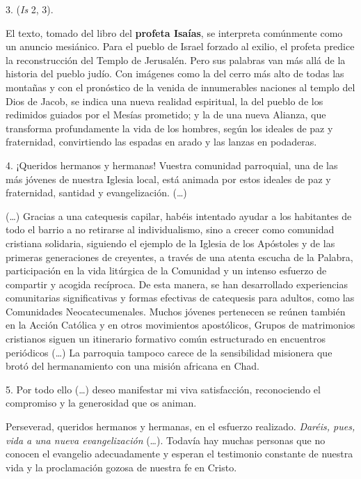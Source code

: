 \begin{body}
	3.  (\emph{Is} 2, 3). 
	
	El texto, tomado del libro del \textbf{profeta Isaías}, se interpreta comúnmente como un anuncio mesiánico. Para el pueblo de Israel forzado al exilio, el profeta predice la reconstrucción del Templo de Jerusalén. Pero sus palabras van más allá de la historia del pueblo judío. Con imágenes como la del cerro más alto de todas las montañas y con el pronóstico de la venida de innumerables naciones al templo del Dios de Jacob, se indica una nueva realidad espiritual, la del pueblo de los redimidos guiados por el Mesías prometido; y la de una nueva Alianza, que transforma profundamente la vida de los hombres, según los ideales de paz y fraternidad, convirtiendo las espadas en arado y las lanzas en podaderas. 
	
	4. ¡Queridos hermanos y hermanas! Vuestra comunidad parroquial, una de las más jóvenes de nuestra Iglesia local, está animada por estos ideales de paz y fraternidad, santidad y evangelización. (\ldots{}) 
	
	(\ldots{}) Gracias a una catequesis capilar, habéis intentado ayudar a los habitantes de todo el barrio a no retirarse al individualismo, sino a crecer como comunidad cristiana solidaria, siguiendo el ejemplo de la Iglesia de los Apóstoles y de las primeras generaciones de creyentes, a través de una atenta escucha de la Palabra, participación en la vida litúrgica de la Comunidad y un intenso esfuerzo de compartir y acogida recíproca. De esta manera, se han desarrollado experiencias comunitarias significativas y formas efectivas de catequesis para adultos, como las Comunidades Neocatecumenales. Muchos jóvenes pertenecen se reúnen también en la Acción Católica y en otros movimientos apostólicos, Grupos de matrimonios cristianos siguen un itinerario formativo común estructurado en encuentros periódicos (\ldots{}) La parroquia tampoco carece de la sensibilidad misionera que brotó del hermanamiento con una misión africana en Chad. 
	
	5. Por todo ello (\ldots{}) deseo manifestar mi viva satisfacción, reconociendo el compromiso y la generosidad que os animan. 
	
	Perseverad, queridos hermanos y hermanas, en el esfuerzo realizado. \emph{Daréis, pues, vida a una nueva evangelización} (\ldots{}). Todavía hay muchas personas que no conocen el evangelio adecuadamente y esperan el testimonio constante de nuestra vida y la proclamación gozosa de nuestra fe en Cristo. 
	

\end{body}
